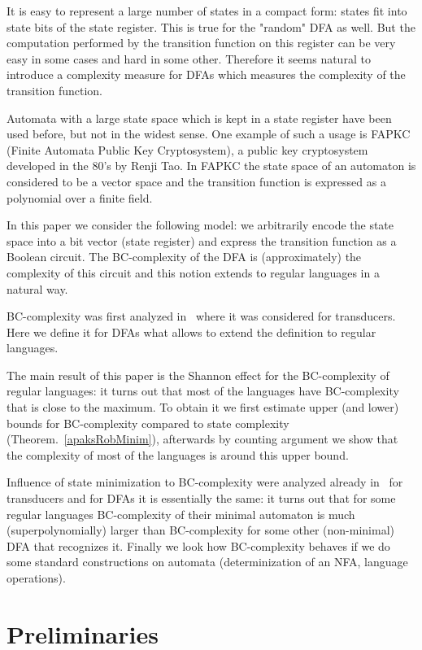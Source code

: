 \documentclass[copyright, creativecommons]{eptcs}
\begin{document}
It is easy to represent a large number of states in a compact form:  states fit into  state bits
of the state register. This is true for the "random" DFA as well. But the computation performed by the transition function
on this register can be very easy in some cases and hard in some other.
Therefore it seems natural to introduce a complexity measure for DFAs which
measures the complexity of the transition function. 

Automata with a large state space which is kept in a state register have been used before, but
not in the widest sense. One example of such a usage is FAPKC~\cite{TR09}
(Finite Automata Public Key Cryptosystem), a public key cryptosystem
developed in the 80's by Renji Tao. In FAPKC the state space of an automaton is
considered to be a vector space and the transition function is expressed as a polynomial over a finite field.

In this paper we consider the following model: we arbitrarily encode the state space into
a bit vector (state register) and express the transition function as a Boolean circuit.
The BC-complexity of the DFA is (approximately) the complexity of this circuit and this notion extends to regular
languages in a natural way.

BC-complexity was first analyzed in~\cite{V11} where it was considered for transducers. Here we define
it for DFAs what allows to extend the definition to regular languages.

The main result of this paper is the Shannon effect for the BC-complexity of regular languages:
it turns out that most of the languages have BC-complexity that is close to the maximum. To obtain it we first
estimate upper (and lower) bounds for BC-complexity compared to state complexity (Theorem.~\ref{apaksRobMinim}),
afterwards by counting argument we show that the complexity of most of the languages is around this upper bound.

Influence of state minimization to BC-complexity were analyzed already in~\cite{V11} for transducers and for DFAs
it is essentially the same: it turns out that for some regular languages BC-complexity of their minimal automaton
is much (superpolynomially) larger than BC-complexity for some other (non-minimal) DFA that recognizes it.
Finally we look how BC-complexity behaves if we do some standard constructions on automata
(determinization of an NFA, language operations).



\section{Preliminaries}
\label{2nod}
\end{document}
